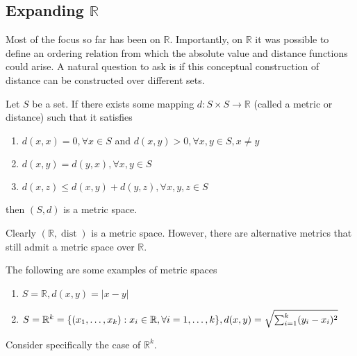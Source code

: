 \documentclass[../notes.tex]{subfiles}
\begin{document}

\subsection{Expanding $\mathbb{R}$}

Most of the focus so far has been on $\mathbb{R}$. Importantly, on $\mathbb{R}$ it was possible to define an ordering relation from which the absolute value and distance functions could arise. A natural question to ask is if this conceptual construction of distance can be constructed over different sets.

\begin{definition}
    Let $S$ be a set. If there exists some mapping $d : S \times S \to \mathbb{R}$ (called a metric or distance) such that it satisfies
    \begin{enumerate}
        \item $d(x,x) = 0, \forall x \in S$ and $d(x,y) > 0, \forall x,y \in S, x\neq y$
        \item $d(x,y) = d(y,x), \forall x,y \in S$
        \item $d(x,z) \leq d(x, y) + d(y, z), \forall x,y,z\in S$
    \end{enumerate}
    then $(S, d)$ is a metric space.
\end{definition}

Clearly $(\mathbb{R}, \operatorname{dist})$ is a metric space. However, there are alternative metrics that still admit a metric space over $\mathbb{R}$.

\begin{example}
    The following are some examples of metric spaces
    \begin{enumerate}[label=\alph*)]
        \item $S = \mathbb{R}, d(x,y) = |x - y|$
        \item $S = \mathbb{R}^k = \qty{(x_1, \ldots, x_k) : x_i \in \mathbb{R}, \forall i = 1,\ldots,k}, d(x,y) = \sqrt{\sum_{i=1}^k (y_i - x_i)^2}$
    \end{enumerate}
\end{example}

Consider specifically the case of $\mathbb{R}^k$.
\end{document}
